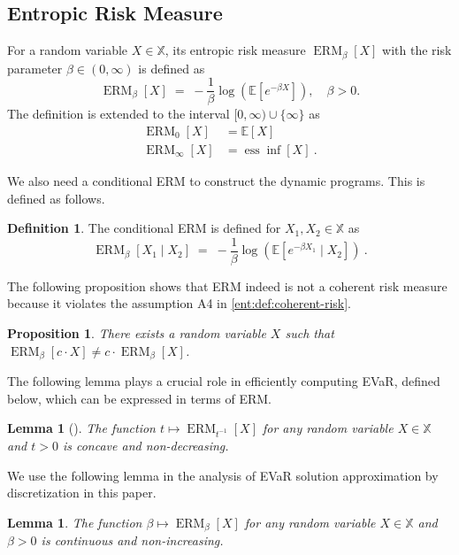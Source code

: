 \documentclass[twoside]{article}
\newcommand{\E}{\mathbb{E}}
\newcommand{\erm}[2]{\operatorname{ERM}_{#1}\left[#2\right]}
\theoremstyle{plain}
\newtheorem{proposition}[theorem]{Proposition}
\newtheorem{lemma}[theorem]{Lemma}
\theoremstyle{definition}
\newtheorem{definition}[theorem]{Definition}
\theoremstyle{remark}
\renewcommand{\cite}[1]{\citep{#1}}
\begin{document}

\subsection{Entropic Risk Measure}
\label{ent:subsec:ERM}

For a random variable $X\in\mathbb X$, its entropic risk measure $\erm{\beta}{X}$ with the risk parameter $\beta \in (0,\infty)$ is defined as
%
\begin{equation*}
\erm{\beta}{X} \;=\; -\frac{1}{\beta}\log\left(\mathbb E[e^{-\beta X}]\right),\quad\beta>0.
\end{equation*}
The definition is extended to the interval $[0,\infty) \cup \{\infty \}$ as
\begin{align*}
  \erm{0}{X} &= \E[X] \\
  \erm{\infty}{X}&= \operatorname{ess} \inf [X]~.
\end{align*}
%

We also need a conditional ERM to construct the dynamic programs. This is defined as follows.
\begin{definition}\label{ent:def:conditional-erm}
The conditional ERM is defined for $X_1,X_2\in\mathbb X$ as
\[
\erm{\beta}{X_1 \mid X_2} \;=\; -\frac{1}{\beta}\log\left(\mathbb E[e^{-\beta X_1} \mid X_2]\right)~.
\]
\end{definition}

The following proposition shows that ERM indeed is not a coherent risk measure because it violates the assumption A4 in \cref{ent:def:coherent-risk}. 
\begin{proposition}
There exists a random variable $X$ such that $\erm{\beta}{c \cdot X} \neq c\cdot \erm{\beta}{X}$.
\end{proposition}

The following lemma plays a crucial role in efficiently computing EVaR, defined below, which can be expressed in terms of ERM. 
\begin{lemma}[\cite{Ahmadi-Javid2012}]
The function $t \mapsto \erm{t^{-1}}{X}$ for any random variable $X\in \mathbb{X}$ and $t > 0$ is concave and non-decreasing.
\end{lemma}

We use the following lemma in the analysis of EVaR solution approximation by discretization in this paper. 
\begin{lemma}\label{ent:prop:erm-nonincreasing}
The function $\beta \mapsto \erm{\beta}{X}$ for any random variable $X \in \mathbb{X}$ and $\beta > 0$ is continuous and non-increasing.
\end{lemma}
\end{document}
